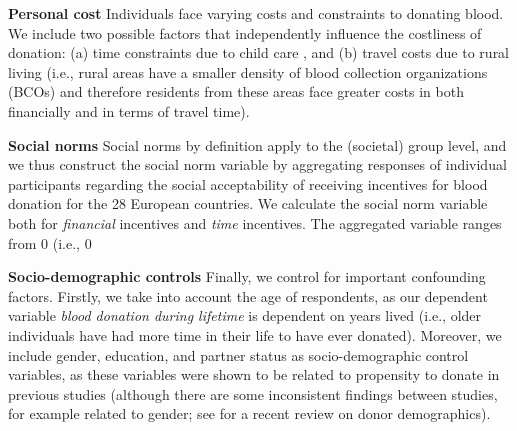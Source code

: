 \documentclass[AER]{AEA}
\begin{document}
\textbf{Personal cost} Individuals face varying costs and constraints to donating blood. We include two possible factors that independently influence the costliness of donation: (a) time constraints due to child care \cite[i.e., parents of small children may perceive time constraints to donate; ][]{piersma_blood_2019}, and (b) travel costs due to rural living (i.e., rural areas have a smaller density of blood collection organizations (BCOs) and therefore residents from these areas face greater costs in both financially and in terms of travel time).

\textbf{Social norms} Social norms by definition apply to the (societal) group level, and we thus construct the social norm variable by aggregating responses of individual participants regarding the social acceptability of receiving incentives for blood donation for the 28 European countries. We calculate the social norm variable both for \textit{financial} incentives and \textit{time} incentives. The aggregated variable ranges from 0 (i.e., 0%

\textbf{Socio-demographic controls} Finally, we control for important confounding factors. Firstly, we take into account the age of respondents, as our dependent variable \textit{blood donation during lifetime} is dependent on years lived (i.e., older individuals have had more time in their life to have ever donated). Moreover, we include gender, education, and partner status as socio-demographic control variables, as these variables were shown to be related to propensity to donate in previous studies (although there are some inconsistent findings between studies, for example related to gender; see \cite{piersma_individual_2017} for a recent review on donor demographics).
\end{document}
